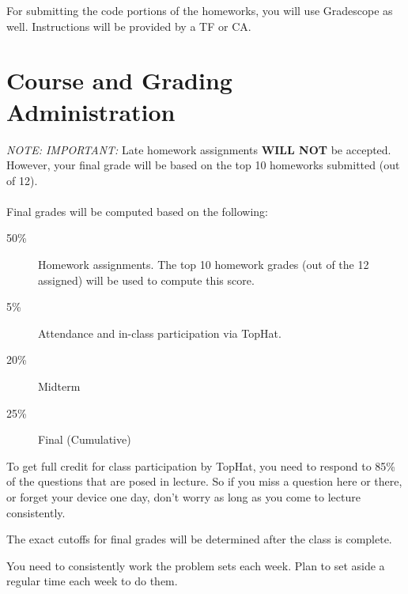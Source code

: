 \documentclass[11pt]{article}
\begin{document}
For submitting the code portions of the homeworks, you will use
Gradescope as well.  Instructions will be provided by a TF or CA.


\newpage
\section*{Course and Grading Administration}

\emph{NOTE: IMPORTANT:} Late homework assignments \textbf{WILL NOT} be
accepted. 
However, your final 
grade will be based on the top 10 homeworks submitted (out of 12).   
\\~\\
Final grades will be computed based on the following:
\begin{description}
\item[50\%] Homework assignments.  The top 10 homework grades (out of the
  12 assigned) will be used to compute this score.
\item[5\%] Attendance and in-class participation via TopHat.
\item[20\%] Midterm
\item[25\%] Final (Cumulative)
\end{description}

To get full credit for class participation by TopHat, you need to 
respond to 85\% of the questions that are posed in lecture.   So if
you miss a question here or there, or forget your device one day, don't
worry as long as you come to lecture consistently.

The exact cutoffs for final grades will be determined after the class is
complete.

You need to consistently work the problem sets each week.   Plan
  to set aside a regular time each week to do them.
\end{document}
